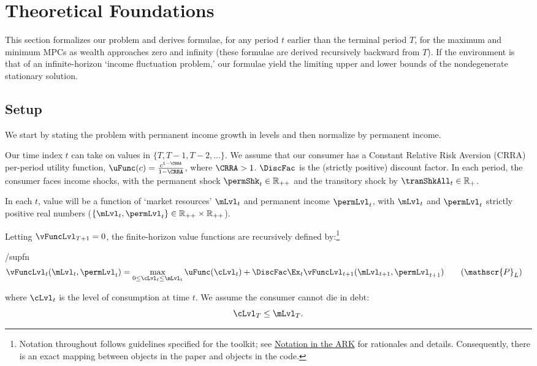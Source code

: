 \documentclass[BufferStockTheory]{subfiles}
\begin{document}
\hypertarget{The-Problem}{}
\section{Theoretical Foundations}

This section formalizes our problem and derives formulae, for any period $t$ earlier than the terminal period $T$, for the maximum and minimum MPCs as wealth approaches zero and infinity (these formulae are derived recursively backward from $T$).  If the environment is that of an infinite-horizon `income fluctuation problem,' our formulae yield the limiting upper and lower bounds of the nondegenerate stationary solution.

\label{sec:Foundations}
\subsection{Setup}\label{subsec:Setup}

We start by stating the problem with permanent income growth in levels and then normalize by permanent income.

Our time index $t$ can take on values in $\{T,T-1,T-2,\dots \}$. We assume that our consumer has a Constant Relative Risk Aversion (CRRA) per-period utility function, $\uFunc(c)=\frac{c^{1-\CRRA}}{1-\CRRA}$, where $\CRRA>1$. $\DiscFac$ is the (strictly positive) discount factor. In each period, the consumer faces income shocks, with the permanent shock $\permShk_{t} \in \mathbb{R}_{++}$ and the transitory shock by $\tranShkAll_{t} \in \mathbb{R}_{+}$. 

In each $t$, value will be a function of `market resources' $\mLvl_{t}$ and permanent income $\permLvl_{t}$, with $\mLvl_{t}$ and $\permLvl_{t}$ strictly positive real numbers ($\{\mLvl_{t} , \permLvl_{t}\} \in \mathbb{R}_{++} \times \mathbb{R}_{++}$).

Letting $\vFuncLvl_{T+1} = 0$, the finite-horizon value functions are recursively defined by:\footnote{Notation throughout follows guidelines specified for the {\ARKurl} toolkit; see \href{https://github.com/econ-ark/HARK/blob/master/Documentation/NARK/NARK.pdf}{Notation in the ARK} for rationales and details.  Consequently, there is an exact mapping between objects in the paper and objects in the code.}
%
\begin{verbatimwrite}{\EqDir/supfn}
  \begin{align}\label{eq:levelRecProblem}
    \vFuncLvl_{t}(\mLvl_{t}, \permLvl_{t}) & = \max_{0 \leq\cLvl_{t} \leq \mLvl_{t}} \uFunc(\cLvl_{t}) + \DiscFac \Ex_{t}\vFuncLvl_{t+1}(\mLvl_{t+1}, \permLvl_{t+1}) \tag{$\mathscr{P}_{L}$}
  \end{align}
\end{verbatimwrite}

where $\cLvl_{t}$ is the level of consumption at time $t$. We assume the consumer cannot die in debt:
%
\begin{equation}\label{eq:NoDebtAtDeath}
\cLvl_{T} \leq  \mLvl_{T} .
\end{equation}
\end{document}
